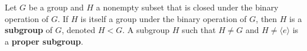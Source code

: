 \begin{definition}
Let $G$ be a group and $H$ a nonempty subset that is closed under the binary operation of $G$. If $H$ is itself a group under the binary operation of $G$, then $H$ is a \textbf{subgroup} of $G$, denoted $H < G$. A subgroup $H$ such that $H \neq G$ and $H \neq \langle e \rangle$ is a \textbf{proper subgroup}.
\end{definition}
